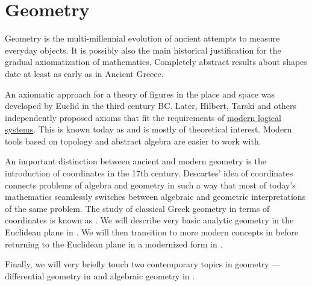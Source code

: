\section{Geometry}\label{sec:geometry}

Geometry is the multi-millennial evolution of ancient attempts to measure everyday objects. It is possibly also the main historical justification for the gradual axiomatization of mathematics. Completely abstract results about shapes date at least as early as in Ancient Greece.

An axiomatic approach for a theory of figures in the place and space was developed by Euclid in the third century BC. Later, Hilbert, Tarski and others independently proposed axioms that fit the requirements of \hyperref[sec:mathematical_logic]{modern logical systems}. This is known today as  and is mostly of theoretical interest. Modern tools based on topology and abstract algebra are easier to work with.

An important distinction between ancient and modern geometry is the introduction of coordinates in the 17th century. Descartes' idea of coordinates connects problems of algebra and geometry in such a way that most of today's mathematics seamlessly switches between algebraic and geometric interpretations of the same problem. The study of classical Greek geometry in terms of coordinates is known as . We will describe very basic analytic geometry in the Euclidean plane in . We will then transition to more modern concepts in  before returning to the Euclidean plane in a modernized form in .

Finally, we will very briefly touch two contemporary topics in geometry --- differential geometry in  and algebraic geometry in .
